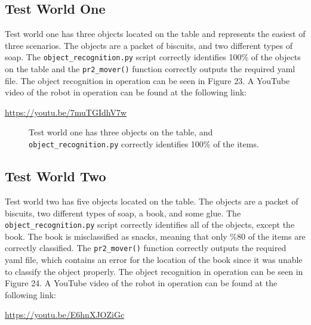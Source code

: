 \documentclass[a4paper]{article}
\begin{document}
\subsection{Test World One}
Test world one has three objects located on the table and represents the easiest of three scenarios. The objects are a packet of biscuits, and two different types of soap. The \verb|object_recognition.py| script correctly identifies 100\% of the objects on the table and the \verb|pr2_mover()| function correctly outputs the required yaml file. The object recognition in operation can be seen in Figure 23. A YouTube video of the robot in operation can be found at the following link:
\begin{center}
	\url{https://youtu.be/7muTGIdhV7w}
\end{center}

\begin{figure}[h]
	\centering
	\caption{Test world one has three objects on the table, and \texttt{object\_recognition.py} correctly identifies 100\% of the items.}
\end{figure}

\subsection{Test World Two}
Test world two has five objects located on the table. The objects are a packet of biscuits, two different types of soap, a book, and some glue. The \verb|object_recognition.py| script correctly identifies all of the objects, except the book. The book is misclassified as snacks, meaning that only \%80 of the items are correctly classified. The \verb|pr2_mover()| function correctly outputs the required yaml file, which contains an error for the location of the book since it was unable to classify the object properly. The object recognition in operation can be seen in Figure 24. A YouTube video of the robot in operation can be found at the following link:
\begin{center}
	\url{https://youtu.be/E6hnXJOZiGc}
\end{center}
\end{document}
